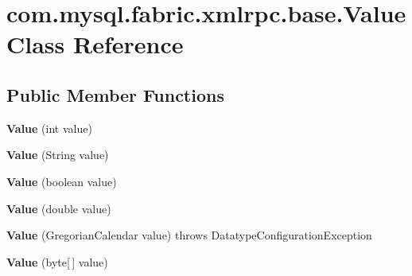 \hypertarget{classcom_1_1mysql_1_1fabric_1_1xmlrpc_1_1base_1_1_value}{}\section{com.\+mysql.\+fabric.\+xmlrpc.\+base.\+Value Class Reference}
\label{classcom_1_1mysql_1_1fabric_1_1xmlrpc_1_1base_1_1_value}
\subsection*{Public Member Functions}
\begin{DoxyCompactItemize}
\item 
\mbox{\label{classcom_1_1mysql_1_1fabric_1_1xmlrpc_1_1base_1_1_value_a1c9d696d761bbd400c946ab14de375a6}} 
{\bfseries Value} (int value)
\item 
\mbox{\label{classcom_1_1mysql_1_1fabric_1_1xmlrpc_1_1base_1_1_value_a8faaf19fc240d5d247681007f97d68de}} 
{\bfseries Value} (String value)
\item 
\mbox{\label{classcom_1_1mysql_1_1fabric_1_1xmlrpc_1_1base_1_1_value_a1864de1e5960b8f0032a87682df72380}} 
{\bfseries Value} (boolean value)
\item 
\mbox{\label{classcom_1_1mysql_1_1fabric_1_1xmlrpc_1_1base_1_1_value_a2c461df927b89930d503d8f819220d9c}} 
{\bfseries Value} (double value)
\item 
\mbox{\label{classcom_1_1mysql_1_1fabric_1_1xmlrpc_1_1base_1_1_value_a68eb98dfe7130aae457056be9f1b97ca}} 
{\bfseries Value} (Gregorian\+Calendar value)  throws Datatype\+Configuration\+Exception 
\item 
\mbox{\label{classcom_1_1mysql_1_1fabric_1_1xmlrpc_1_1base_1_1_value_aa3cd9af5adc6579bf5514fb528c4afdb}} 
{\bfseries Value} (byte\mbox{[}$\,$\mbox{]} value)
\item 
\mbox{\label{classcom_1_1mysql_1_1fabric_1_1xmlrpc_1_1base_1_1_value_abd9a09f59c3541acd12b597b9021e131}} 

\end{DoxyCompactItemize}
